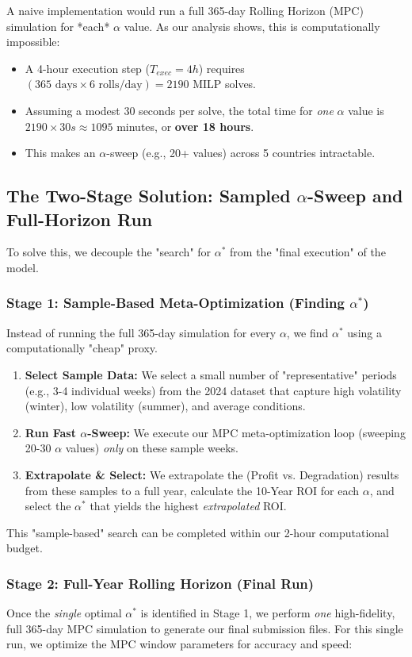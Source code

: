 \documentclass[11pt, a4paper]{article}
\begin{document}
A naive implementation would run a full 365-day Rolling Horizon (MPC) simulation for *each* $\alpha$ value. As our analysis shows, this is computationally impossible:
\begin{itemize}
    \item A 4-hour execution step ($T_{exec}=4h$) requires $(365 \text{ days} \times 6 \text{ rolls/day}) = 2190$ MILP solves.
    \item Assuming a modest 30 seconds per solve, the total time for \emph{one} $\alpha$ value is $2190 \times 30s \approx 1095$ minutes, or \textbf{over 18 hours}.
    \item This makes an $\alpha$-sweep (e.g., 20+ values) across 5 countries intractable.
\end{itemize}

\subsection{The Two-Stage Solution: Sampled $\alpha$-Sweep and Full-Horizon Run}
To solve this, we decouple the "search" for $\alpha^*$ from the "final execution" of the model.

\subsubsection{Stage 1: Sample-Based Meta-Optimization (Finding $\alpha^*$)}
Instead of running the full 365-day simulation for every $\alpha$, we find $\alpha^*$ using a computationally "cheap" proxy.
\begin{enumerate}
    \item \textbf{Select Sample Data:} We select a small number of "representative" periods (e.g., 3-4 individual weeks) from the 2024 dataset that capture high volatility (winter), low volatility (summer), and average conditions.
    \item \textbf{Run Fast $\alpha$-Sweep:} We execute our MPC meta-optimization loop (sweeping 20-30 $\alpha$ values) \emph{only} on these sample weeks.
    \item \textbf{Extrapolate \& Select:} We extrapolate the (Profit vs. Degradation) results from these samples to a full year, calculate the 10-Year ROI for each $\alpha$, and select the $\alpha^*$ that yields the highest \emph{extrapolated} ROI.
\end{enumerate}
This "sample-based" search can be completed within our 2-hour computational budget.

\subsubsection{Stage 2: Full-Year Rolling Horizon (Final Run)}
Once the \emph{single} optimal $\alpha^*$ is identified in Stage 1, we perform \emph{one} high-fidelity, full 365-day MPC simulation to generate our final submission files. For this single run, we optimize the MPC window parameters for accuracy and speed:
\end{document}
